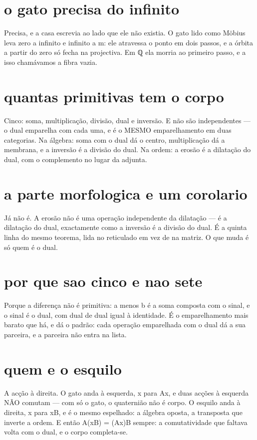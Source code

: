 \documentclass[11pt,a4paper]{article}
\begin{document}
\section{o gato precisa do infinito}
Precisa, e a casa escrevia ao lado que ele não existia. O gato lido como Möbius leva zero
a infinito e infinito a m: ele atravessa o ponto em dois passos, e a órbita a partir do
zero só fecha na projectiva. Em ℚ ela morria ao primeiro passo, e a isso chamávamos a
fibra vazia.

\section{quantas primitivas tem o corpo}
Cinco: soma, multiplicação, divisão, dual e inversão. E não são independentes — o dual
emparelha com cada uma, e é o MESMO emparelhamento em duas categorias. Na álgebra: soma
com o dual dá o centro, multiplicação dá a membrana, e a inversão é a divisão do dual. Na
ordem: a erosão é a dilatação do dual, com o complemento no lugar da adjunta.

\section{a parte morfologica e um corolario}
Já não é. A erosão não é uma operação independente da dilatação — é a dilatação do dual,
exactamente como a inversão é a divisão do dual. É a quinta linha do mesmo teorema, lida
no reticulado em vez de na matriz. O que muda é só quem é o dual.

\section{por que sao cinco e nao sete}
Porque a diferença não é primitiva: a menos b é a soma composta com o sinal, e o sinal é
o dual, com dual de dual igual à identidade. É o emparelhamento mais barato que há, e dá
o padrão: cada operação emparelhada com o dual dá a sua parceira, e a parceira não entra
na lista.

\section{quem e o esquilo}
A acção à direita. O gato anda à esquerda, x para Ax, e duas acções à esquerda NÃO
comutam — com só o gato, o quaternião não é corpo. O esquilo anda à direita, x para xB, e
é o mesmo espelhado: a álgebra oposta, a transposta que inverte a ordem. E então A(xB) =
(Ax)B sempre: a comutatividade que faltava volta com o dual, e o corpo completa-se.
\end{document}
